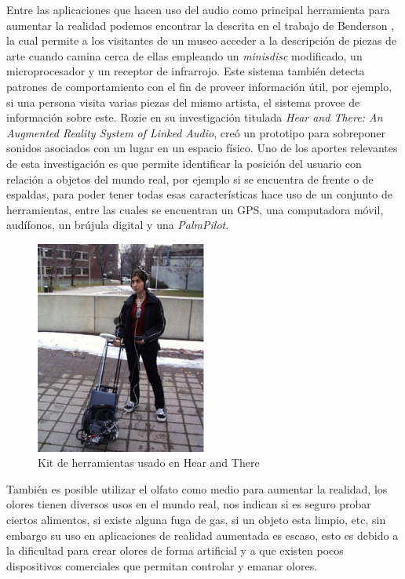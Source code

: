 \documentclass[12pt,a4paper,spanish,openany]{book}
\begin{document}
Entre las aplicaciones que hacen uso del audio como principal herramienta para
aumentar la realidad podemos encontrar la descrita en el trabajo de Benderson
\cite{Bederson:1995:AAR:223355.223526}, la cual permite a los visitantes de un
museo acceder a la descripción de piezas de arte cuando camina cerca de ellas
empleando un \emph{minisdisc} modificado, un microprocesador y un receptor de
infrarrojo. Este sistema también detecta patrones de comportamiento con el fin
de proveer información útil, por ejemplo, si una persona visita varias piezas
del mismo artista, el sistema provee de información sobre este. Rozie \cite{hat} en su
investigación titulada
\emph{Hear and There: An Augmented Reality System of Linked Audio}, creó un
prototipo para sobreponer sonidos asociados con un lugar en un espacio físico.
Uno de los aportes relevantes de esta investigación es que permite identificar
la posición del usuario con relación a objetos del mundo real, por ejemplo si se
encuentra de frente o de espaldas, para poder tener todas esas características
hace uso de un conjunto de herramientas, entre las cuales se encuentran un GPS,
una computadora móvil, audífonos, un brújula digital y una \emph{PalmPilot}.

\begin{figure}
\begin{center}
\includegraphics[width=0.5\textwidth]{./img/hearthere.jpg}
\caption{Kit de herramientas usado en Hear and There}
\end{center}
\end{figure}



También es posible utilizar el olfato como medio para aumentar la realidad, los
olores tienen diversos usos en el mundo real, nos indican si es seguro probar
ciertos alimentos, si existe alguna fuga de gas, si un objeto esta limpio, etc,
sin embargo su uso en aplicaciones de realidad aumentada es escaso, esto es
debido a la dificultad para crear olores de forma artificial y a que
existen pocos dispositivos comerciales que permitan controlar y emanar olores.
\end{document}
